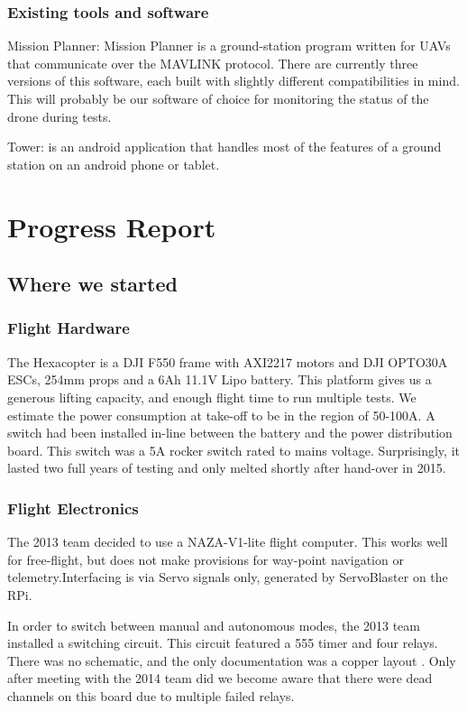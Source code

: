 \documentclass[a4paper, 11pt, titlepage]{article}
\begin{document}
    \subsubsection{Existing tools and software}
    Mission Planner:
      Mission Planner is a ground-station program written for UAVs that communicate over the MAVLINK protocol.  There are currently three versions of this software, each built with slightly different compatibilities in mind.  This will probably be our software of choice for monitoring the status of the drone during tests.

    Tower: \cite{3dr-tower}  is an android application that handles most of the features of a ground station on an android phone or tablet.


  \section{Progress Report}
  \subsection{Where we started}
    \subsubsection{Flight Hardware}
      The Hexacopter is a DJI F550 frame with AXI2217 motors and DJI OPTO30A ESCs, 254mm props and a 6Ah 11.1V Lipo battery.
      This platform gives us a generous lifting capacity, and enough flight time to run multiple tests.
      We estimate the power consumption at take-off to be in the region of 50-100A.  A switch had been installed in-line between the battery and the power distribution board. This switch was a 5A rocker switch rated to mains voltage.  Surprisingly, it lasted two full years of testing and only melted shortly after hand-over in 2015.

    \subsubsection{Flight Electronics}
      The 2013 team  decided to use a NAZA-V1-lite flight computer.  This works well for free-flight, but does not make provisions for way-point navigation or telemetry.Interfacing is via Servo signals only, generated by ServoBlaster on the RPi.

      In order to switch between manual and autonomous modes, the 2013 team installed a switching circuit. This circuit featured a 555 timer and four relays.
      There was no schematic, and the only documentation was a copper layout \cite[p. 27-28]{OConnor}.  Only after meeting with the 2014 team did we become aware that there were dead channels on this board due to multiple failed relays.
\end{document}
